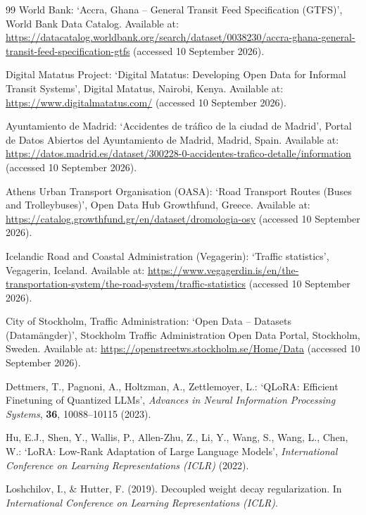 \documentclass[a4paper,fleqn]{cas-sc}
\begin{document}
\begin{thebibliography}{99}
World Bank:
`Accra, Ghana -- General Transit Feed Specification (GTFS)',
World Bank Data Catalog.
Available at:
\url{https://datacatalog.worldbank.org/search/dataset/0038230/accra-ghana-general-transit-feed-specification-gtfs}
(accessed 10 September 2026).

Digital Matatus Project:
`Digital Matatus: Developing Open Data for Informal Transit Systems',
Digital Matatus, Nairobi, Kenya.
Available at:
\url{https://www.digitalmatatus.com/}
(accessed 10 September 2026).

Ayuntamiento de Madrid:
`Accidentes de tr\'afico de la ciudad de Madrid',
Portal de Datos Abiertos del Ayuntamiento de Madrid,
Madrid, Spain.
Available at:
\url{https://datos.madrid.es/dataset/300228-0-accidentes-trafico-detalle/information}
(accessed 10 September 2026).

Athens Urban Transport Organisation (OASA):
`Road Transport Routes (Buses and Trolleybuses)',
Open Data Hub Growthfund, Greece.
Available at:
\url{https://catalog.growthfund.gr/en/dataset/dromologia-osy}
(accessed 10 September 2026).

Icelandic Road and Coastal Administration (Vegager{\dh}in):
`Traffic statistics',
Vegager{\dh}in, Iceland.
Available at:
\url{https://www.vegagerdin.is/en/the-transportation-system/the-road-system/traffic-statistics}
(accessed 10 September 2026).

City of Stockholm, Traffic Administration:
`Open Data -- Datasets (Datam\"angder)',
Stockholm Traffic Administration Open Data Portal,
Stockholm, Sweden.
Available at:
\url{https://openstreetws.stockholm.se/Home/Data}
(accessed 10 September 2026).

Dettmers, T., Pagnoni, A., Holtzman, A., Zettlemoyer, L.:
`QLoRA: Efficient Finetuning of Quantized LLMs',
\textit{Advances in Neural Information Processing Systems},
\textbf{36}, 10088--10115 (2023).

Hu, E.J., Shen, Y., Wallis, P., Allen-Zhu, Z., Li, Y.,
Wang, S., Wang, L., Chen, W.:
`LoRA: Low-Rank Adaptation of Large Language Models',
\textit{International Conference on Learning Representations (ICLR)}
(2022).

Loshchilov, I., \& Hutter, F. (2019).
Decoupled weight decay regularization.
In \textit{International Conference on Learning
Representations (ICLR)}.


\end{thebibliography}
\end{document}

